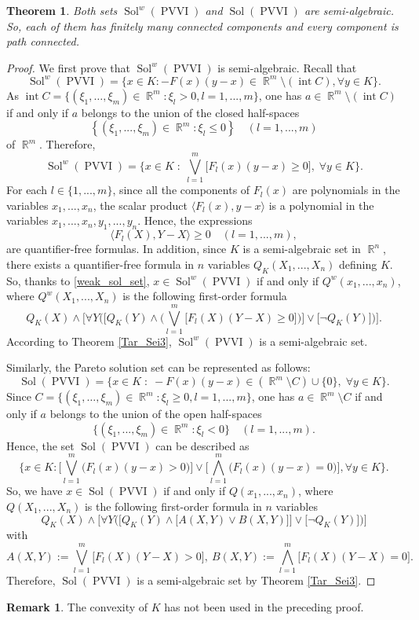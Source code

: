 \documentclass[]{interact}
\theoremstyle{plain}%
\newtheorem{theorem}{Theorem}[section]
\theoremstyle{definition}
\newtheorem{remark}{Remark}[section]
\DeclareMathOperator{\Sol}{Sol}
\DeclareMathOperator{\PVVI}{PVVI}
\DeclareMathOperator{\R}{\mathbb{R}}
\DeclareMathOperator{\inte}{int}
\begin{document}
\begin{theorem}\label{finite} Both sets $\Sol^w(\PVVI)$ and $\Sol(\PVVI)$  are semi-algebraic. So, each of them has finitely many connected components and every component is path connected.
\end{theorem}
\begin{proof} We first prove that $\Sol^w(\PVVI)$ is semi-algebraic. Recall that
	$$\Sol^w(\PVVI)=\big\{x\in K:-F(x)(y-x)\in \R^m\setminus (\inte C),\forall y\in K\big\}.$$
	As $\inte C=\{(\xi_1,\dots,\xi_m)\in \R^m:
	\xi_l> 0,l=1,...,m\}$,  one has $a\in\R^m\setminus (\inte C)$ if and only if $a$ belongs to the union of the closed half-spaces $$\left\{(\xi_1,...,\xi_m)\in\R^m:\xi_l\leq 0\right\}\quad (l=1,...,m)$$ of $\R^m$. Therefore,
	\begin{equation}\label{weak_sol_set} \Sol^w(\PVVI)=\Big\lbrace x\in K\;:\; \bigvee_{l=1}^{m} \big[F_l(x)(y-x)\geq 0\big], \;\forall y\in K\Big\rbrace.	
	\end{equation}
	For each $l\in\{1,...,m\}$, since all the components of $F_l(x)$ are polynomials in the variables $x_1,...,x_n$, the scalar product $\langle F_l(x),y-x\rangle$ is a polynomial in the variables $x_1,...,x_n,y_1,...,y_n$. Hence, the expressions $$\langle F_l(X),Y-X\rangle\geq 0\quad (l=1,...,m),$$ are quantifier-free formulas. In addition, since $K$ is a semi-algebraic set in $\R^n$, there exists a quantifier-free formula in $n$ variables $Q_K(X_1,...,X_n)$ defining $K.$ So, thanks to \eqref{weak_sol_set}, $x\in \Sol^w(\PVVI)$ if and only if $Q^w(x_1,...,x_n)$, where $Q^w(X_1,...,X_n)$ is the following first-order formula
	$$Q_K(X) \wedge\Big[\forall Y\Big(\Big[Q_K(Y) \wedge\Big(\bigvee_{l=1}^{m} \big[F_l(X)(Y-X)\geq 0\big]\Big)\Big] \vee \big[ \neg Q_K(Y)\big] \Big)\Big] .$$
	According to Theorem \ref{Tar_Sei3}, $\Sol^w(\PVVI)$ is a semi-algebraic set.
	
	Similarly, the Pareto solution set can be represented as follows:
	$$\Sol(\PVVI)=\big\{x\in K\;:\; -F(x)(y-x)\in (\R^m\setminus C)\cup \{0\},\; \forall y\in K\big\}.$$
	Since $C=\{(\xi_1,\dots,\xi_m)\in \R^m:
	\xi_l\geq 0, l=1,...,m\}$,  one has $a\in\R^m\setminus C$ if and only if $a$ belongs to the union of the open half-spaces $$\big\{(\xi_1,...,\xi_m)\in\R^m:\xi_l< 0\big\}\quad (l=1,...,m).$$ Hence, the set $\Sol(\PVVI)$ can be described as
	$$\Big\lbrace x\in K: \Big[ \bigvee_{l=1}^{m} \big(F_l(x)(y-x)> 0\big)\Big] \vee \Big[ \bigwedge_{l=1}^{m} \big(F_l(x)(y-x)= 0\big)\Big], \forall y\in K\Big\rbrace.$$
	So, we have $x\in \Sol(\PVVI)$ if and only if $Q(x_1,...,x_n)$, where $Q(X_1,...,X_n)$ is the following first-order formula in $n$ variables
	$$Q_K(X) \wedge\Big[ \forall Y\Big(\Big[Q_K(Y) \wedge \big[A(X,Y) \vee B(X,Y)\big]\Big]\vee \big[\neg Q_K(Y)\Big]\Big)\Big] $$
	with $$A(X,Y):=\bigvee_{l=1}^{m} \big[ F_l(X)(Y-X)> 0\big], \ B(X,Y):= \bigwedge_{l=1}^{m} \big[ F_l(X)(Y-X)= 0 \big].$$
	Therefore, $\Sol(\PVVI)$ is a semi-algebraic set by Theorem \ref{Tar_Sei3}.
\end{proof}
\begin{remark}\rm
	The convexity of $K$ has not been used in the preceding proof.
\end{remark}
\end{document}
